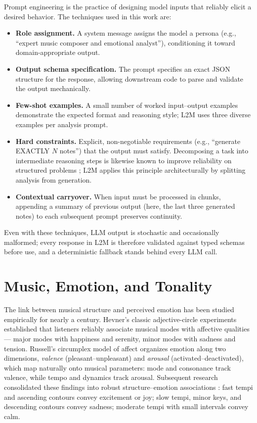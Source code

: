 Prompt engineering is the practice of designing model inputs that reliably
elicit a desired behavior. The techniques used in this work are:

\begin{itemize}
    \item \textbf{Role assignment.} A system message assigns the model a
    persona (e.g., ``expert music composer and emotional analyst''),
    conditioning it toward domain-appropriate output.
    \item \textbf{Output schema specification.} The prompt specifies an
    exact JSON structure for the response, allowing downstream code to parse
    and validate the output mechanically.
    \item \textbf{Few-shot examples.} A small number of worked input--output
    examples \cite{brown20fewshot} demonstrate the expected format and
    reasoning style; L2M uses three diverse examples per analysis prompt.
    \item \textbf{Hard constraints.} Explicit, non-negotiable requirements
    (e.g., ``generate EXACTLY $N$ notes'') that the output must satisfy.
    Decomposing a task into intermediate reasoning steps is likewise known
    to improve reliability on structured problems \cite{wei22cot}; L2M
    applies this principle architecturally by splitting analysis from
    generation.
    \item \textbf{Contextual carryover.} When input must be processed in
    chunks, appending a summary of previous output (here, the last three
    generated notes) to each subsequent prompt preserves continuity.
\end{itemize}

Even with these techniques, LLM output is stochastic and occasionally
malformed; every response in L2M is therefore validated against typed
schemas before use, and a deterministic fallback stands behind every LLM
call.

\section{Music, Emotion, and Tonality}
\label{sec:bg-emotion}

The link between musical structure and perceived emotion has been studied
empirically for nearly a century. Hevner's classic adjective-circle
experiments \cite{hevner36expression} established that listeners reliably
associate musical modes with affective qualities --- major modes with
happiness and serenity, minor modes with sadness and tension. Russell's
circumplex model of affect \cite{russell80circumplex} organizes emotion
along two dimensions, \emph{valence} (pleasant--unpleasant) and
\emph{arousal} (activated--deactivated), which map naturally onto musical
parameters: mode and consonance track valence, while tempo and dynamics
track arousal. Subsequent research consolidated these findings into robust
structure--emotion associations \cite{juslin01musicemotion,
gabrielsson10emotion}: fast tempi and ascending contours convey excitement
or joy; slow tempi, minor keys, and descending contours convey sadness;
moderate tempi with small intervals convey calm.

